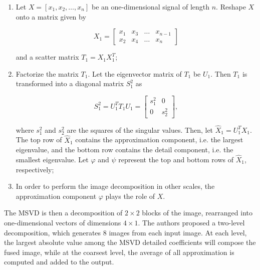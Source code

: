 \begin{enumerate}[label=\Roman* -]
    \item Let $X = [x_{1},x_{2},\dots,x_{n}]$ be an one-dimensional signal of length $n$. Reshape $X$ onto a matrix given by 
    
    \begin{equation*}
        X_{1} = \begin{bmatrix}
                x_{1} & x_{3} & \dots & x_{n-1} \\
                x_{2} & x_{4} & \dots & x_{n}
                \end{bmatrix}
    \end{equation*}
    
    and a scatter matrix $T_{1} = X_{1}X_{1}^{T}$;
    
    \item Factorize the matrix $T_{1}$. Let the eigenvector matrix of $T_{1}$ be $U_{1}$. Then $T_{1}$ is transformed into a diagonal matrix $S_{1}^{2}$ as
    
    \begin{equation*}
        S_{1}^{2} = U_{1}^{T}T_{1}U_{1} =
        \begin{bmatrix}
            s_{1}^{2} & 0\\
            0 & s_{2}^{2}
        \end{bmatrix},
    \end{equation*}
    
    where $s_{1}^{2}$ and $s_{2}^{2}$ are the squares of the singular values. Then, let $\hat{X}_{1} = U_{1}^{T}X_{1}$. The top row of $\hat{X}_{1}$ contains the approximation component, i.e. the largest eigenvalue, and the bottom row contains the detail component, i.e. the smallest eigenvalue. Let $\varphi$ and $\psi$ represent the top and bottom rows of $\hat{X}_{1}$, respectively;
    
    \item In order to perform the image decomposition in other scales, the approximation component $\varphi$ plays the role of $X$.

\end{enumerate}

The MSVD is then a decomposition of $2 \times 2$ blocks of the image, rearranged into one-dimensional vectors of dimensions $4 \times 1$. The authors proposed a two-level decomposition, which generates 8 images from each input image. At each level, the largest absolute value among the MSVD detailed coefficients will compose the fused image, while at the coarsest level, the average of all approximation is computed and added to the output.
